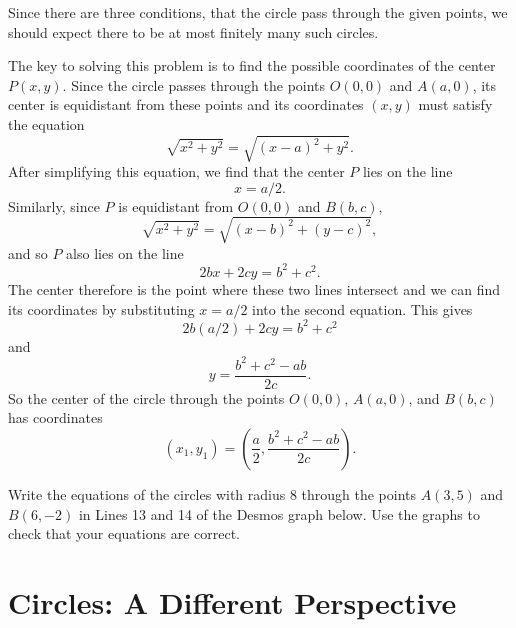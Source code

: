 \documentclass{ximera}
\begin{document}
\begin{explanation}
Since there are three conditions, that the circle pass through the given points, we should expect there to be at most finitely many such circles. 

The key to solving this problem is to find the possible coordinates of the center $P(x,y)$. Since the circle passes through the points $O(0,0)$ and $A(a,0)$, its center is equidistant from these points and its coordinates $(x,y)$ must satisfy the equation
\[
    \sqrt{x^2 + y^2} = \sqrt{(x-a)^2+y^2} .
\]
After simplifying this equation, we find that the center $P$ lies on the line  
\[
   x = a/2.
\]
Similarly, since $P$ is equidistant from $O(0,0)$ and $B(b,c)$,
\[
  \sqrt{x^2 + y^2} = \sqrt{(x-b)^2+(y-c)^2} ,
\]
and so $P$ also lies on the line 
\[
  2bx + 2cy = b^2 + c^2 .
\]
The center therefore is the point where these two lines intersect and we can find its coordinates by substituting $x=a/2$ into the second equation. This gives
\[
        2b (a/2) + 2cy = b^2 + c^2
\]
and
\[
      y = \frac{b^2+c^2-ab}{2c} .
\]
So the center of the circle through the points $O(0,0)$, $A(a,0)$, and $B(b,c)$ has coordinates
\[
  (x_1, y_1) = \left(   \frac{a}{2}  ,  \frac{b^2+c^2-ab}{2c}    \right) .
\]

\begin{exploration}\label{exp:circle7}
Write the equations of the circles with radius 8 through the points $A(3,5)$ and $B(6,-2)$ in Lines 13 and 14 of the Desmos graph below. Use the graphs to check that your equations are correct.
 
 
\begin{onlineOnly}
    \begin{center}
\end{center}
\end{onlineOnly}
\end{exploration}





\end{explanation}






\section{Circles: A Different Perspective}
\end{document}
